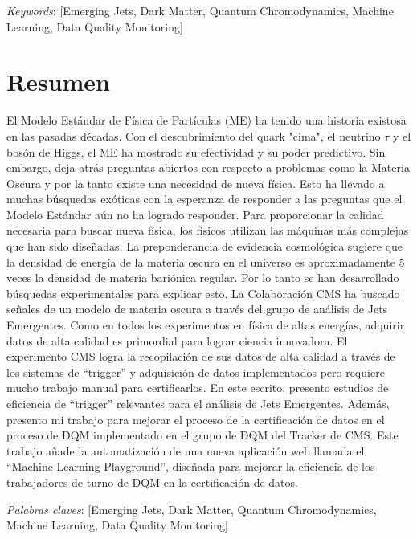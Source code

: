\vspace*{1cm}

\textit{Keywords}:  [Emerging Jets, Dark Matter, Quantum Chromodynamics, Machine Learning, Data Quality Monitoring]


\chapter{Resumen}

El Modelo Estándar de Física de Partículas (ME) ha tenido una historia existosa en las pasadas décadas. Con el descubrimiento del quark "cima", el neutrino $\tau$ y el bosón de Higgs, el ME ha mostrado su efectividad y su poder predictivo. Sin embargo, deja atrás preguntas abiertos con respecto a problemas como la Materia Oscura y por la tanto existe una necesidad de nueva física. Esto ha llevado a muchas búsquedas exóticas con la esperanza de responder a las preguntas que el Modelo Estándar aún no ha logrado responder. Para proporcionar la calidad necesaria para buscar nueva física, los físicos utilizan las máquinas más complejas que han sido diseñadas. La preponderancia de evidencia cosmológica sugiere que la densidad de energía de la materia oscura en el universo es aproximadamente 5 veces la densidad de materia bariónica regular. Por lo tanto se han desarrollado búsquedas experimentales para explicar esto. La Colaboración CMS ha buscado señales de un modelo de materia oscura a través del grupo de análisis de Jets Emergentes. Como en todos los experimentos en física de altas energías, adquirir datos de alta calidad es primordial para lograr ciencia innovadora.
El experimento CMS logra la recopilación de sus datos de alta calidad a través de los sistemas de ``trigger'' y adquisición de datos implementados pero requiere mucho trabajo manual para certificarlos. En este escrito, presento estudios de eficiencia de ``trigger'' relevantes para el análisis de Jets Emergentes. Además, presento mi trabajo para mejorar el proceso de la certificación de datos en el proceso de DQM implementado en el grupo de DQM del Tracker de CMS. Este trabajo añade la automatización de una nueva aplicación web llamada el ``Machine Learning Playground'', diseñada para mejorar la eficiencia de los trabajadores de turno de DQM en la certificación de datos.



\textit{Palabras claves}:  [Emerging Jets, Dark Matter, Quantum Chromodynamics, Machine Learning, Data Quality Monitoring]
